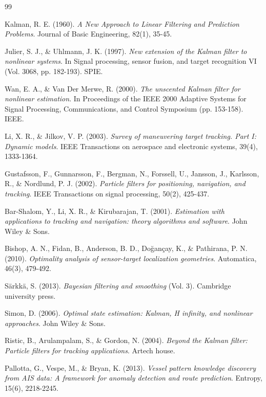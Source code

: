 \newpage
\begin{thebibliography}{99}

Kalman, R. E. (1960). \textit{A New Approach to Linear Filtering and Prediction Problems}. Journal of Basic Engineering, 82(1), 35-45.

Julier, S. J., \& Uhlmann, J. K. (1997). \textit{New extension of the Kalman filter to nonlinear systems}. In Signal processing, sensor fusion, and target recognition VI (Vol. 3068, pp. 182-193). SPIE.

Wan, E. A., \& Van Der Merwe, R. (2000). \textit{The unscented Kalman filter for nonlinear estimation}. In Proceedings of the IEEE 2000 Adaptive Systems for Signal Processing, Communications, and Control Symposium (pp. 153-158). IEEE.

Li, X. R., \& Jilkov, V. P. (2003). \textit{Survey of maneuvering target tracking. Part I: Dynamic models}. IEEE Transactions on aerospace and electronic systems, 39(4), 1333-1364.

Gustafsson, F., Gunnarsson, F., Bergman, N., Forssell, U., Jansson, J., Karlsson, R., \& Nordlund, P. J. (2002). \textit{Particle filters for positioning, navigation, and tracking}. IEEE Transactions on signal processing, 50(2), 425-437.

Bar-Shalom, Y., Li, X. R., \& Kirubarajan, T. (2001). \textit{Estimation with applications to tracking and navigation: theory algorithms and software}. John Wiley \& Sons.

Bishop, A. N., Fidan, B., Anderson, B. D., Doğançay, K., \& Pathirana, P. N. (2010). \textit{Optimality analysis of sensor-target localization geometries}. Automatica, 46(3), 479-492.

Särkkä, S. (2013). \textit{Bayesian filtering and smoothing} (Vol. 3). Cambridge university press.

Simon, D. (2006). \textit{Optimal state estimation: Kalman, H infinity, and nonlinear approaches}. John Wiley \& Sons.

Ristic, B., Arulampalam, S., \& Gordon, N. (2004). \textit{Beyond the Kalman filter: Particle filters for tracking applications}. Artech house.

Pallotta, G., Vespe, M., \& Bryan, K. (2013). \textit{Vessel pattern knowledge discovery from AIS data: A framework for anomaly detection and route prediction}. Entropy, 15(6), 2218-2245.


\end{thebibliography}
